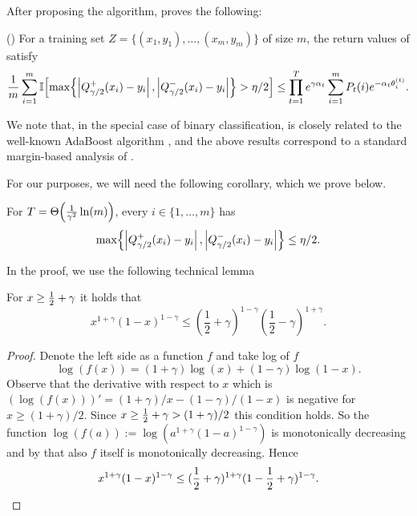 \documentclass[12pt,a4paper,oneside,onecolumn]{book}
\begin{document}
After proposing the algorithm, \citet{kegl2003robust} proves the following:

\begin{lemma}
\label{lem:kegl}
(\citet{kegl2003robust}) 
For a training set $Z = \{(x_{1},y_{1}),\ldots,(x_{m},y_{m})\}$ of size $m$, 
the return values of  satisfy 
\begin{equation*}
\frac{1}{m} \sum_{i=1}^{m} \mathbb{I}\!\left[ \max\!\left\{ \left| Q_{\gamma/2}^{+}(x_{i}) - y_{i} \right|, \left| Q_{\gamma/2}^{-}(x_{i}) - y_{i} \right| \right\} > \eta/2 \right] 
\leq \prod_{t=1}^{T} e^{\gamma \alpha_{t}} \sum_{i=1}^{m} P_{t}(i) e^{-\alpha_{t} \theta_{i}^{(t)}}.
\end{equation*}
\end{lemma}

We note that, in the special case of binary classification, 
is closely related to the well-known AdaBoost algorithm
\citep{FreundSchapire97}, 
and the above results correspond to a
standard
margin-based analysis of
\citet{MR1673273}.

    

For our purposes, we will need the following corollary,
which we prove below.

\begin{corollary}
\label{cor:kegl-T-size}
For $T = \Theta\!\left(\frac{1}{\gamma^{2}} \ln(m)\right)$, 
every $i \in \{1,\ldots,m\}$ has 
\begin{equation*}
\max\!\left\{ \left| Q_{\gamma/2}^{+}(x_{i}) - y_{i} \right|, \left| Q_{\gamma/2}^{-}(x_{i}) - y_{i} \right| \right\} \leq \eta/2.
\end{equation*}
\end{corollary}

In the proof, we use the following technical lemma

\begin{lemma}
  \label{lem:cor-tech-kegl}
  For $x \geq \frac{1}{2} + \gamma$ it holds that
  \[
    x^{1+\gamma} (1-x)^{1-\gamma}
    \leq
    \left(\frac{1}{2} + \gamma\right)^{1-\gamma}
    \left(\frac{1}{2} - \gamma\right)^{1+\gamma}
    .
  \]
\end{lemma}

\begin{proof}
  Denote the left side as a function $f$
  and take log of $f$ 
  \[
    \log(f(x)) = (1+\gamma)\log(x) + (1-\gamma)\log(1-x).
  \]
  Observe that the derivative with respect to $x$ which is
  $(\log(f(x)))' = (1+\gamma)/x - (1-\gamma)/(1-x)$
  is negative for
  $x \geq (1+\gamma)/2$.
  Since
  $x \geq \frac{1}{2} + \gamma > (1+\gamma)/2$
  this condition holds.
  So the function
  $\log(f(a)) := \log\left(a^{1+\gamma} (1-a)^{1-\gamma}\right)$
  is monotonically decreasing
  and by that also $f$ itself is monotonically decreasing.
  Hence
  \begin{align*}
    x^{1+\gamma} (1-x)^{1-\gamma}
    \leq
    (\frac{1}{2} + \gamma)^{1+\gamma}
    (1 - \frac{1}{2} + \gamma)^{1-\gamma}
    .
  \end{align*}

\end{proof}
\end{document}
